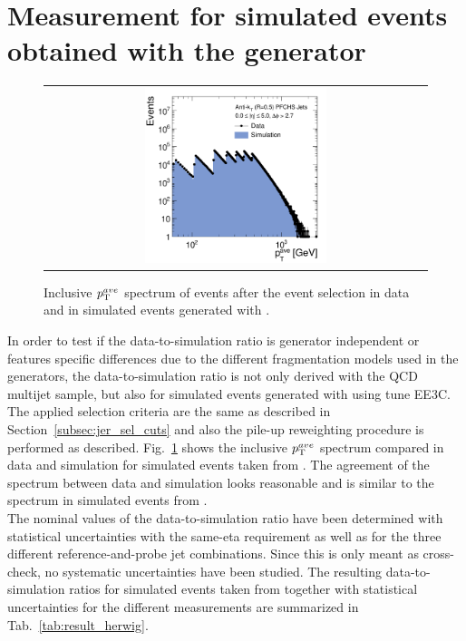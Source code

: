 \section{Measurement for simulated events obtained with the \herwig generator} 
\label{sec:jer_result_herwig}
\begin{figure}[!h]
  \centering
  \begin{tabular}{c}
                \includegraphics[width=0.49\textwidth]{figures/HerwigPtAve__AfterAsymmHistos.pdf}
  \end{tabular}
  \caption{Inclusive $p_{\text{T}}^{ave}$ spectrum of events after the event selection in data and in simulated events generated with \herwig.}
  \label{fig:control_plots_herwig}
\end{figure}
In order to test if the data-to-simulation ratio is generator independent or features specific differences due to the different fragmentation models used in the generators, the data-to-simulation ratio is not only derived with the \pythia QCD multijet sample, but also for simulated events generated with \herwig using tune EE3C. \\
The applied selection criteria are the same as described in Section~\ref{subsec:jer_sel_cuts} and also the pile-up reweighting procedure is performed as described. Fig.~\ref{fig:control_plots_herwig} shows the inclusive $p_{\text{T}}^{ave}$ spectrum compared in data and simulation for simulated events taken from \herwig. The agreement of the \ptave spectrum between data and simulation looks reasonable and is similar to the spectrum in simulated events from \pythia.\\
The nominal values of the data-to-simulation ratio have been determined with statistical uncertainties with the same-eta requirement as well as for the three different reference-and-probe jet combinations. Since this is only meant as cross-check, no systematic uncertainties have been studied. The resulting data-to-simulation ratios for simulated events taken from \herwig together with statistical uncertainties for the different measurements are summarized in Tab.~\ref{tab:result_herwig}. 
